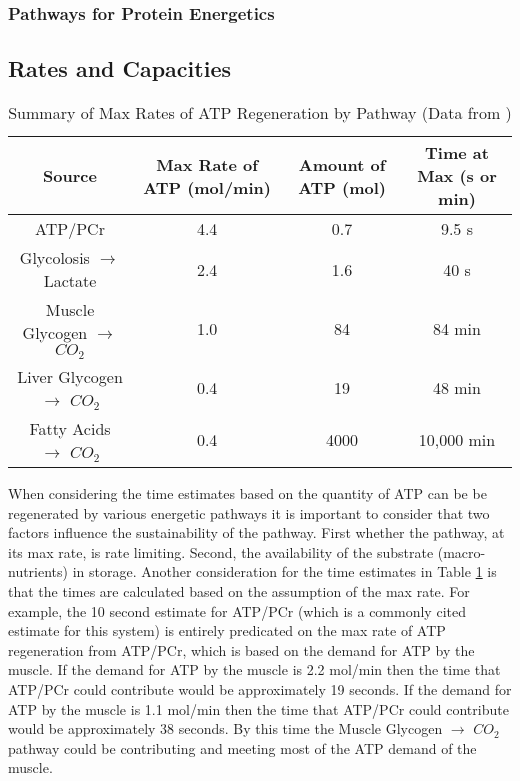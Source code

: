 \subsubsection{Pathways for Protein Energetics}



\subsection{Rates and Capacities}

\begin{table}[h!]
\centering
\begin{tabular}{||c c c c||} 
 \hline
Source & Max Rate of ATP (mol/min) & Amount of ATP (mol) & Time at Max (s or min)\\ [0.5ex] 
 \hline\hline
 ATP/PCr & 4.4  & 0.7 & 9.5 s \\
 Glycolosis $\rightarrow$ Lactate &  2.4 & 1.6 & 40 s \\ 
 Muscle Glycogen $\rightarrow$ $CO_2$ & 1.0 & 84 & 84 min\\
 Liver Glycogen $\rightarrow$ $CO_2$  & 0.4 & 19 & 48 min \\ 
 Fatty Acids $\rightarrow$ $CO_2$ & 0.4 & 4000 & 10,000 min \\[1ex] 
 \hline
\end{tabular}
\caption{Summary of Max Rates of ATP Regeneration by Pathway (\footnotesize{Data from \cite{feher_quantitative_2017}})}
\label{table:ATP_Rates}
\end{table}

When considering the time estimates based on the quantity of ATP can be be regenerated by various energetic pathways it is important to consider that two factors influence the sustainability of the pathway. First whether the pathway, at its max rate, is rate limiting. Second, the availability of the substrate (macro-nutrients) in storage. Another consideration for the time estimates in Table \ref{table:ATP_Rates} is that the times are calculated based on the assumption of the max rate. For example, the 10 second estimate for ATP/PCr (which is a commonly cited estimate for this system) is entirely predicated on the max rate of ATP regeneration from ATP/PCr, which is based on the demand for ATP by the muscle. If the demand for ATP by the muscle is 2.2 mol/min then the time that ATP/PCr could contribute would be approximately 19 seconds. If the demand for ATP by the muscle is 1.1 mol/min then the time that ATP/PCr could contribute would be approximately 38 seconds. By this time the Muscle Glycogen $\rightarrow$ $CO_2$ pathway could be contributing and meeting most of the ATP demand of the muscle. 

